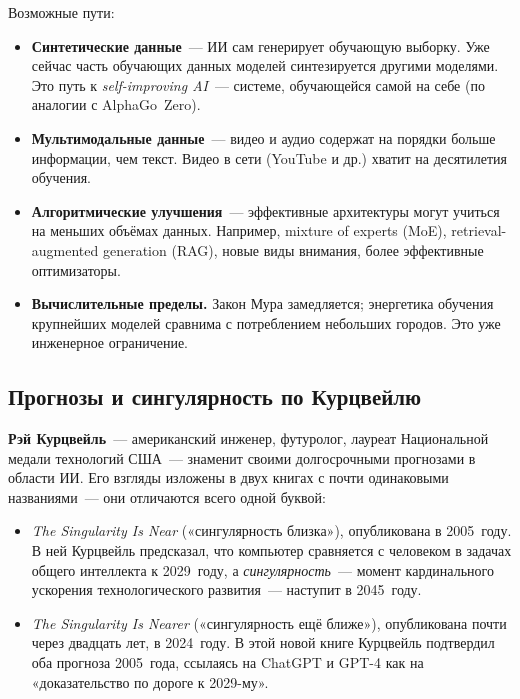 Возможные пути:
\begin{itemize}\itemsep1pt
  \item \textbf{Синтетические данные}~--- ИИ сам генерирует обучающую
        выборку. Уже сейчас часть обучающих данных моделей
        синтезируется другими моделями. Это путь к
        \emph{self-improving AI}~--- системе, обучающейся самой на
        себе (по аналогии с AlphaGo~Zero).
  \item \textbf{Мультимодальные данные}~--- видео и аудио содержат на
        порядки больше информации, чем текст. Видео в сети (YouTube
        и др.) хватит на десятилетия обучения.
  \item \textbf{Алгоритмические улучшения}~--- эффективные архитектуры
        могут учиться на меньших объёмах данных. Например, mixture of
        experts (MoE), retrieval-augmented generation (RAG),
        новые виды внимания, более эффективные оптимизаторы.
  \item \textbf{Вычислительные пределы.} Закон Мура замедляется;
        энергетика обучения крупнейших моделей сравнима с
        потреблением небольших городов. Это уже инженерное ограничение.
\end{itemize}

\subsection{Прогнозы и сингулярность по Курцвейлю}
\label{ssec:kurzweil}

\textbf{Рэй Курцвейль}~--- американский инженер, футуролог, лауреат
Национальной медали технологий США~--- знаменит своими долгосрочными
прогнозами в области ИИ. Его взгляды изложены в двух книгах с почти
одинаковыми названиями~--- они отличаются всего одной буквой:

\begin{itemize}\itemsep1pt
  \item \emph{The Singularity Is Near} («сингулярность близка»),
        опубликована в 2005~году. В ней Курцвейль предсказал, что
        компьютер сравняется с человеком в задачах общего интеллекта
        к 2029~году, а \emph{сингулярность}~--- момент кардинального
        ускорения технологического развития~--- наступит в 2045~году.
  \item \emph{The Singularity Is Nearer} («сингулярность ещё ближе»),
        опубликована почти через двадцать лет, в 2024~году. В этой
        новой книге Курцвейль подтвердил оба прогноза 2005~года,
        ссылаясь на ChatGPT и GPT-4 как на «доказательство по дороге
        к 2029-му».
\end{itemize}

